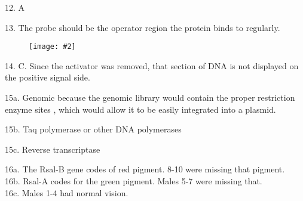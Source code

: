 \documentclass{article}
\newcommand{\makefig}[2]{
\begin{figure}[h]
\centering
\texttt{[image: \#2]}
\end{figure}
}
\begin{document}
12. A
\vspace{2mm}

13. The probe should be the operator region the protein binds to regularly.
\makefig{0.7}{P13.png}
\vspace{2mm}

14. C. Since the activator was removed, that section of DNA is not displayed on the positive signal side.

15a. Genomic because the genomic library would contain the proper restriction enzyme sites , which would allow it to be easily integrated into a plasmid.

15b. Taq polymerase or other DNA polymerases

15c. Reverse transcriptase

16a. The Rsal-B gene codes of red pigment. 8-10 were missing that pigment.\\
16b. Rsal-A codes for the green pigment. Males 5-7 were missing that.\\
16c. Males 1-4 had normal vision.
\end{document}
